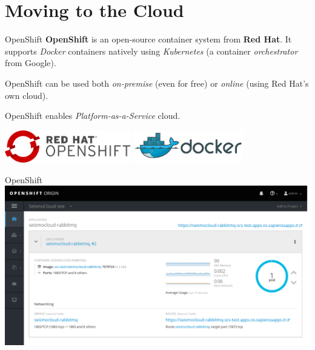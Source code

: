 
\section{Moving to the Cloud}

\begin{frame}{OpenShift}
\textbf{OpenShift} is an open-source container system from
\textbf{Red Hat}. It supports \textit{Docker} containers natively using
\textit{Kubernetes} (a container \textit{orchestrator} from Google).

OpenShift can be used both \textit{on-premise} (even for free) or
\textit{online} (using Red Hat's own cloud).

OpenShift enables \textit{Platform-as-a-Service} cloud.

\centering
\vspace{1em}
\includegraphics[keepaspectratio=true,height=40pt]{openshift_logo}
\hspace{1em}
\includegraphics[keepaspectratio=true,height=40pt]{docker_logo}
\end{frame}


\begin{frame}{OpenShift}
\centering
\hspace*{-0.4in}
\includegraphics[width=1.19\textwidth]{openshift}
\end{frame}


